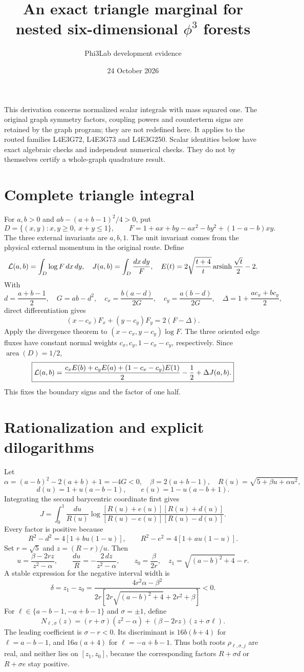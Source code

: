 \documentclass[11pt]{article}
\title{An exact triangle marginal for nested six-dimensional \(\phi^3\) forests}
\author{Phi3Lab development evidence}
\date{24 October 2026}
\newcommand{\asinh}{\operatorname{arsinh}}
\begin{document}
\maketitle
\noindent
This derivation concerns normalized scalar integrals with mass squared one.
The original graph symmetry factors, coupling powers and counterterm signs
are retained by the graph program; they are not redefined here.
It applies to the routed families L4E3G72, L4E3G73 and L4E3G250.
Scalar identities below have exact algebraic checks and independent numerical
checks. They do not by themselves certify a whole-graph quadrature result.

\section{Complete triangle integral}
For \(a,b>0\) and \(ab-(a+b-1)^2/4>0\), put
\[
 D=\{(x,y):x,y\geq0,\ x+y\leq1\},\qquad
 F=1+ax+by-ax^2-by^2+(1-a-b)xy .
\]
The three external invariants are \(a,b,1\). The unit invariant comes from
the physical external momentum in the original route. Define
\[
 {\cal L}(a,b)=\int_D\log F\,dx\,dy,\quad
 J(a,b)=\int_D\frac{dx\,dy}{F},\quad
 E(t)=2\sqrt{\frac{t+4}{t}}\asinh\frac{\sqrt t}{2}-2 .
\]
With
\[
 d=\frac{a+b-1}{2},\quad G=ab-d^2,\quad
 c_x=\frac{b(a-d)}{2G},\quad c_y=\frac{a(b-d)}{2G},\quad
 \Delta=1+\frac{ac_x+bc_y}{2},
\]
direct differentiation gives
\[
 (x-c_x)F_x+(y-c_y)F_y=2(F-\Delta).
\]
Apply the divergence theorem to
\((x-c_x,y-c_y)\log F\). The three oriented edge fluxes have constant
normal weights \(c_x,c_y,1-c_x-c_y\), respectively. Since
\(\operatorname{area}(D)=1/2\),
\[
 \boxed{\displaystyle
 {\cal L}(a,b)=
 \frac{c_xE(b)+c_yE(a)+(1-c_x-c_y)E(1)}{2}
 -\frac12+\Delta J(a,b).}
\]
This fixes the boundary signs and the factor of one half.

\section{Rationalization and explicit dilogarithms}
Let
\[
 \alpha=(a-b)^2-2(a+b)+1=-4G<0,\quad
 \beta=2(a+b-1),\quad R(u)=\sqrt{5+\beta u+\alpha u^2},
\]
\[
 d(u)=1+u(a-b-1),\qquad e(u)=1-u(a-b+1).
\]
Integrating the second barycentric coordinate first gives
\[
 J=\int_0^1\frac{du}{R(u)}
 \log\frac{[R(u)+e(u)][R(u)+d(u)]}
 {[R(u)-e(u)][R(u)-d(u)]}.
\]
Every factor is positive because
\[
 R^2-d^2=4[1+bu(1-u)],\qquad
 R^2-e^2=4[1+au(1-u)].
\]
Set \(r=\sqrt5\) and \(z=(R-r)/u\). Then
\[
 u=\frac{\beta-2rz}{z^2-\alpha},\qquad
 \frac{du}{R}=-\frac{2\,dz}{z^2-\alpha},\qquad
 z_0=\frac{\beta}{2r},\quad
 z_1=\sqrt{(a-b)^2+4}-r .
\]
A stable expression for the negative interval width is
\[
 \delta=z_1-z_0=
 \frac{4r^2\alpha-\beta^2}
 {2r[2r\sqrt{(a-b)^2+4}+2r^2+\beta]}<0.
\]
For \(\ell\in\{a-b-1,-a+b-1\}\) and \(\sigma=\pm1\), define
\[
 N_{\ell,\sigma}(z)
 =(r+\sigma)(z^2-\alpha)
   +(\beta-2rz)(z+\sigma\ell).
\]
The leading coefficient is \(\sigma-r<0\). Its discriminant is
\(16b(b+4)\) for \(\ell=a-b-1\), and \(16a(a+4)\) for
\(\ell=-a+b-1\). Thus both roots \(\rho_{\ell,\sigma,j}\) are real,
and neither lies on \([z_1,z_0]\), because the corresponding factors
\(R+\sigma d\) or \(R+\sigma e\) stay positive.
\end{document}
